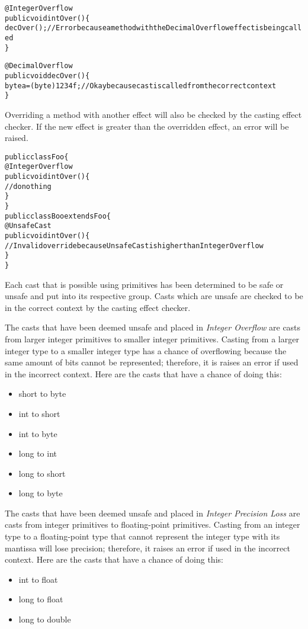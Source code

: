 \begin{alltt}
@IntegerOverflow
public void intOver() \{
    decOver(); //Error because a method with the DecimalOverflow effect is being called
\}

@DecimalOverflow
public void decOver() \{
    byte a = (byte) 1234f; //Okay because cast is called from the correct context
\}
\end{alltt}

Overriding a method with another effect will also be checked by the casting effect checker. If the new effect is greater than the overridden effect, an error will be raised.

\begin{alltt}
public class Foo \{
    @IntegerOverflow
    public void intOver() \{
        //do nothing
    \}
\}
public class Boo extends Foo \{
    @UnsafeCast
    public void intOver() \{
        //Invalid override because UnsafeCast is higher than IntegerOverflow
    \}
\}
\end{alltt}

Each cast that is possible using primitives has been determined to be safe or unsafe and put into its respective group. Casts which are unsafe are checked to be in the correct context by the casting effect checker.


The casts that have been deemed unsafe and placed in \emph{Integer Overflow} are casts from larger integer primitives to smaller integer primitives. Casting from a larger integer type to a smaller integer type has a chance of overflowing because the same amount of bits cannot be represented; therefore, it is raises an error if used in the incorrect context. Here are the casts that have a chance of doing this:
\begin{itemize}
\item
short to byte
\item
int to short
\item
int to byte
\item
long to int
\item
long to short
\item
long to byte
\end{itemize}


The casts that have been deemed unsafe and placed in \emph{Integer Precision Loss} are casts from integer primitives to floating-point primitives. Casting from an integer type to a floating-point type that cannot represent the integer type with its mantissa will lose precision; therefore, it raises an error if used in the incorrect context. Here are the casts that have a chance of doing this:
\begin{itemize}
\item
int to float
\item
long to float
\item
long to double
\end{itemize}

